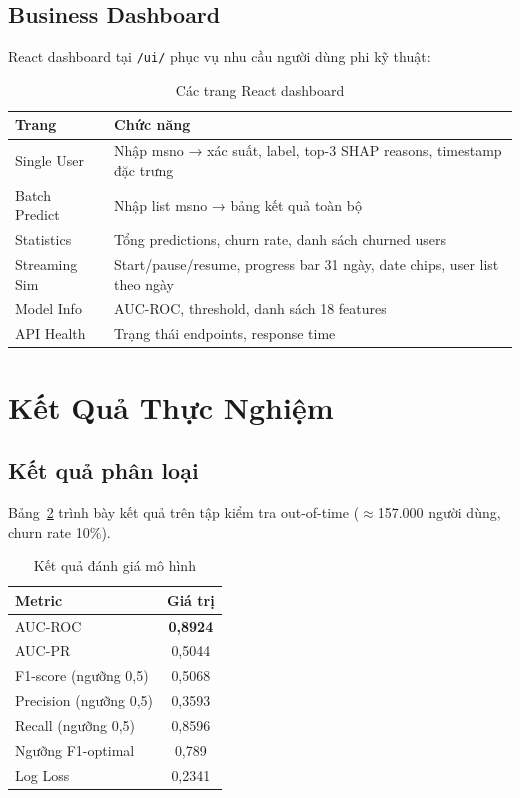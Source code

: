 \documentclass[conference]{IEEEtran}
\begin{document}
\subsection{Business Dashboard}

React dashboard tại \texttt{/ui/} phục vụ nhu cầu người dùng phi kỹ thuật:

\begin{table}[htbp]
\caption{Các trang React dashboard}
\label{tab:dashboard}
\centering
\begin{tabular}{p{2.5cm}p{5cm}}
\toprule
\textbf{Trang} & \textbf{Chức năng} \\
\midrule
Single User & Nhập msno → xác suất, label, top-3 SHAP reasons, timestamp đặc trưng \\
Batch Predict & Nhập list msno → bảng kết quả toàn bộ \\
Statistics & Tổng predictions, churn rate, danh sách churned users \\
Streaming Sim & Start/pause/resume, progress bar 31 ngày, date chips, user list theo ngày \\
Model Info & AUC-ROC, threshold, danh sách 18 features \\
API Health & Trạng thái endpoints, response time \\
\bottomrule
\end{tabular}
\end{table}

\section{Kết Quả Thực Nghiệm}
\label{sec:results}

\subsection{Kết quả phân loại}

Bảng~\ref{tab:results} trình bày kết quả trên tập kiểm tra out-of-time
($\approx$157.000 người dùng, churn rate 10\%).

\begin{table}[htbp]
\caption{Kết quả đánh giá mô hình}
\label{tab:results}
\centering
\begin{tabular}{lc}
\toprule
\textbf{Metric} & \textbf{Giá trị} \\
\midrule
AUC-ROC & \textbf{0,8924} \\
AUC-PR & 0,5044 \\
F1-score (ngưỡng 0,5) & 0,5068 \\
Precision (ngưỡng 0,5) & 0,3593 \\
Recall (ngưỡng 0,5) & 0,8596 \\
Ngưỡng F1-optimal & 0,789 \\
Log Loss & 0,2341 \\
\bottomrule
\end{tabular}
\end{table}
\end{document}
